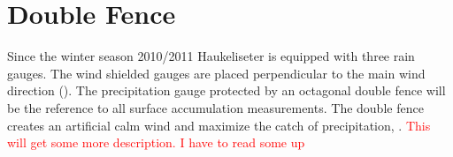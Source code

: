 \section{Double Fence}

Since the winter season 2010/2011 Haukeliseter is equipped with three rain gauges. The wind shielded gauges are placed perpendicular to the main wind direction (). The precipitation gauge protected by an octagonal double fence will be the reference to all surface accumulation measurements. The double fence creates an artificial calm wind and maximize the catch of precipitation, \citep{wolff_new_2010, wolff_measurements_2013, wolff_derivation_2015}. \textcolor{red}{This will get some more description. I have to read some up}
%

